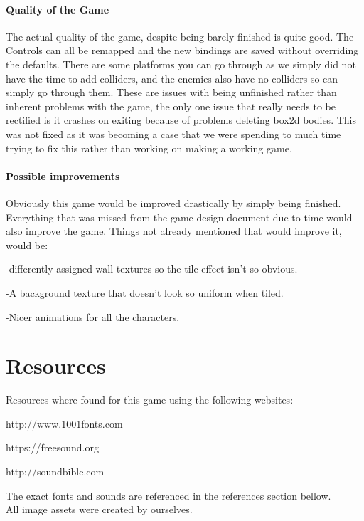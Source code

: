 \documentclass[10pt, a4paper]{article}
\begin{document}
	\paragraph{Quality of the Game}
	The actual quality of the game, despite being barely finished is quite good. The Controls can all be remapped and the new bindings are saved without overriding the defaults. There are some platforms you can go through as we simply did not have the time to add colliders, and the enemies also have no colliders so can simply go through them. These are issues with being unfinished rather than inherent problems with the game, the only one issue that really needs to be rectified is it crashes on exiting because of problems deleting box2d bodies. This was not fixed as it was becoming a case that we were spending to much time trying to fix this rather than working on making a working game.
	\paragraph{Possible improvements}
	Obviously this game would be improved drastically by simply being finished. Everything that was missed from the game design document due to time would also improve the game. Things not already mentioned that would improve it, would be:
	
	-differently assigned wall textures so the tile effect isn't so obvious.
	
	-A background texture that doesn't look so uniform when tiled.
	
	-Nicer animations for all the characters.
	
	\section{Resources}
	Resources where found for this game using the following websites:
	
	http://www.1001fonts.com
	
	https://freesound.org
	
	http://soundbible.com
	
	The exact fonts and sounds are referenced in the references section bellow.\\
	
	All image assets were created by ourselves.
	
\end{document}
